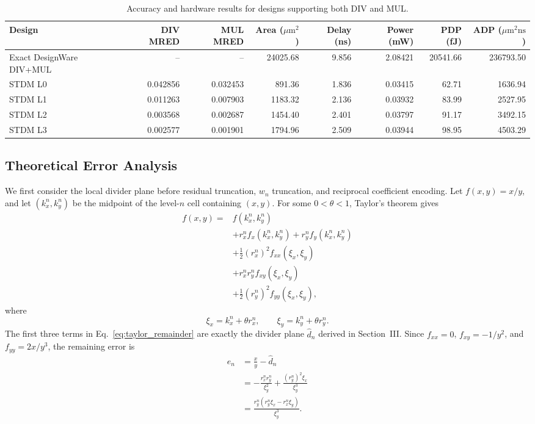 \documentclass[conference]{IEEEtran}
\newcommand{\um}{\ensuremath{\mu\mathrm{m}^2}}
\begin{document}
\begin{table}[!b]
\caption{Accuracy and hardware results for designs supporting both DIV and MUL.}
\label{tab:divmul_comparison}
\centering\scriptsize
\setlength{\tabcolsep}{3.2pt}
\begin{tabular}{lrrrrrrr}
\toprule
Design & DIV MRED & MUL MRED & Area (\um) & Delay (ns) & Power (mW) & PDP (fJ) & ADP ($\mu\mathrm{m}^2\mathrm{ns}$) \\
\midrule
Exact DesignWare DIV+MUL & -- & -- & 24025.68 & 9.856 & 2.08421 & 20541.66 & 236793.50 \\
\midrule
STDM L0 & 0.042856 & 0.032453 & 891.36 & 1.836 & 0.03415 & 62.71 & 1636.94 \\
STDM L1 & 0.011263 & 0.007903 & 1183.32 & 2.136 & 0.03932 & 83.99 & 2527.95 \\
STDM L2 & 0.003568 & 0.002687 & 1454.40 & 2.401 & 0.03797 & 91.17 & 3492.15 \\
STDM L3 & 0.002577 & 0.001901 & 1794.96 & 2.509 & 0.03944 & 98.95 & 4503.29 \\
\bottomrule
\end{tabular}
\end{table}

\iffalse
\subsection{Theoretical Error Analysis}
We first consider the local divider plane before residual truncation,
$w_n$ truncation, and reciprocal coefficient encoding. Let
$f(x,y)=x/y$, and let $(k_x^n,k_y^n)$ be the midpoint of the level-$n$ cell
containing $(x,y)$. For some $0<\theta<1$, Taylor's theorem gives
\begin{equation}
\begin{aligned}
f(x,y)={}&f(k_x^n,k_y^n)\\
&+r_x^n f_x(k_x^n,k_y^n)
 +r_y^n f_y(k_x^n,k_y^n)\\
&+\frac{1}{2}(r_x^n)^2f_{xx}(\xi_x,\xi_y)\\
&+r_x^nr_y^nf_{xy}(\xi_x,\xi_y)\\
&+\frac{1}{2}(r_y^n)^2f_{yy}(\xi_x,\xi_y),
\end{aligned}
\label{eq:taylor_remainder}
\end{equation}
where
\begin{equation}
 \xi_x=k_x^n+\theta r_x^n,\qquad
 \xi_y=k_y^n+\theta r_y^n.
\end{equation}
The first three terms in Eq.~\eqref{eq:taylor_remainder} are exactly the
divider plane $\widehat d_n$ derived in Section~III. Since
$f_{xx}=0$, $f_{xy}=-1/y^2$, and $f_{yy}=2x/y^3$, the remaining error is
\begin{equation}
\begin{aligned}
e_n
&=\frac{x}{y}-\widehat d_n\\
&=-\frac{r_x^nr_y^n}{\xi_y^2}
  +\frac{(r_y^n)^2\xi_x}{\xi_y^3}\\
&=\frac{r_y^n(r_y^n\xi_x-r_x^n\xi_y)}{\xi_y^3}.
\end{aligned}
\label{eq:divider_remainder}
\end{equation}
\end{document}
